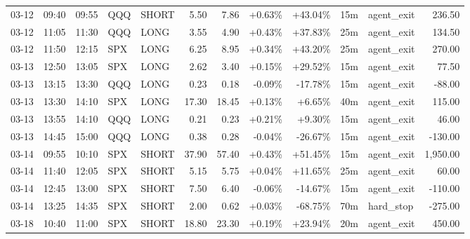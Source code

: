 \documentclass[11pt,a4paper]{article}
\begin{document}
\begin{center}
\begin{longtable}{>{\color{txtmain}}l l l l l r r r r r >{\color{txtmain}}l r}
03-12 & 09:40 & 09:55 & QQQ & SHORT & 5.50 & 7.86 & \textcolor{wingreen}{+0.63\%} & \textcolor{wingreen}{+43.04\%} & 15m & agent\_exit & \textcolor{wingreen}{236.50} \\
03-12 & 11:05 & 11:30 & QQQ & LONG & 3.55 & 4.90 & \textcolor{wingreen}{+0.43\%} & \textcolor{wingreen}{+37.83\%} & 25m & agent\_exit & \textcolor{wingreen}{134.50} \\
03-12 & 11:50 & 12:15 & SPX & LONG & 6.25 & 8.95 & \textcolor{wingreen}{+0.34\%} & \textcolor{wingreen}{+43.20\%} & 25m & agent\_exit & \textcolor{wingreen}{270.00} \\
03-13 & 12:50 & 13:05 & SPX & LONG & 2.62 & 3.40 & \textcolor{wingreen}{+0.15\%} & \textcolor{wingreen}{+29.52\%} & 15m & agent\_exit & \textcolor{wingreen}{77.50} \\
03-13 & 13:15 & 13:30 & QQQ & LONG & 0.23 & 0.18 & \textcolor{lossred}{-0.09\%} & \textcolor{lossred}{-17.78\%} & 15m & agent\_exit & \textcolor{lossred}{-88.00} \\
03-13 & 13:30 & 14:10 & SPX & LONG & 17.30 & 18.45 & \textcolor{wingreen}{+0.13\%} & \textcolor{wingreen}{+6.65\%} & 40m & agent\_exit & \textcolor{wingreen}{115.00} \\
03-13 & 13:55 & 14:10 & QQQ & LONG & 0.21 & 0.23 & \textcolor{wingreen}{+0.21\%} & \textcolor{wingreen}{+9.30\%} & 15m & agent\_exit & \textcolor{wingreen}{46.00} \\
03-13 & 14:45 & 15:00 & QQQ & LONG & 0.38 & 0.28 & \textcolor{lossred}{-0.04\%} & \textcolor{lossred}{-26.67\%} & 15m & agent\_exit & \textcolor{lossred}{-130.00} \\
03-14 & 09:55 & 10:10 & SPX & SHORT & 37.90 & 57.40 & \textcolor{wingreen}{+0.43\%} & \textcolor{wingreen}{+51.45\%} & 15m & agent\_exit & \textcolor{wingreen}{1,950.00} \\
03-14 & 11:40 & 12:05 & SPX & SHORT & 5.15 & 5.75 & \textcolor{wingreen}{+0.04\%} & \textcolor{wingreen}{+11.65\%} & 25m & agent\_exit & \textcolor{wingreen}{60.00} \\
03-14 & 12:45 & 13:00 & SPX & SHORT & 7.50 & 6.40 & \textcolor{lossred}{-0.06\%} & \textcolor{lossred}{-14.67\%} & 15m & agent\_exit & \textcolor{lossred}{-110.00} \\
03-14 & 13:25 & 14:35 & SPX & SHORT & 2.00 & 0.62 & \textcolor{wingreen}{+0.03\%} & \textcolor{lossred}{-68.75\%} & 70m & hard\_stop & \textcolor{lossred}{-275.00} \\
03-18 & 10:40 & 11:00 & SPX & SHORT & 18.80 & 23.30 & \textcolor{wingreen}{+0.19\%} & \textcolor{wingreen}{+23.94\%} & 20m & agent\_exit & \textcolor{wingreen}{450.00} \\

\end{longtable}
\end{center}
\end{document}
